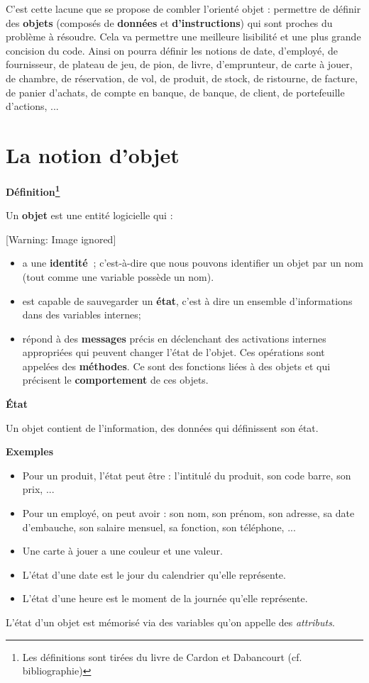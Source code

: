 {
C'est cette lacune que se propose de combler
l'orienté objet : permettre de définir des
\textbf{objets} (composés de \textbf{données} et
\textbf{d'instructions}) qui sont proches du problème
à résoudre. Cela va permettre une meilleure lisibilité et une plus
grande concision du code. Ainsi on pourra définir les notions de date,
d'employé, de fournisseur, de plateau de jeu, de pion,
de livre, d'emprunteur, de carte à jouer, de chambre,
de réservation, de vol, de produit, de stock, de ristourne, de facture,
de panier d'achats, de compte en banque, de banque, de
client, de portefeuille d'actions, ...}

\section{La notion d'objet}
{\sffamily\bfseries\upshape
Définition\footnote{Les définitions sont tirées du livre de Cardon et
Dabancourt (cf. bibliographie)}}

{
Un \textbf{objet} est une entité logicielle qui :}

\begin{center}
 [Warning: Image ignored] %

\end{center}
\liststyleListi
\begin{itemize}
\item {
a une \textbf{identité~}; c'est-à-dire que nous pouvons
identifier un objet par un nom (tout comme une variable possède un
nom).}
\item {
est capable de sauvegarder un \textbf{état}, c'est à
dire un ensemble d'informations dans des variables
internes;}
\item {
répond à des \textbf{messages} précis en déclenchant des activations
internes appropriées qui peuvent changer l'état de
l'objet. Ces opérations sont appelées des
\textbf{méthodes}. Ce sont des fonctions liées à des objets et qui
précisent le \textbf{comportement} de ces objets.}
\end{itemize}
{\sffamily\bfseries\upshape
État}

{
Un objet contient de l'information, des données qui
définissent son état. }

{\bfseries
Exemples}

\liststyleListv
\begin{itemize}
\item {
Pour un produit, l'état peut être :
l'intitulé du produit, son code barre, son prix, ... }
\item {
Pour un employé, on peut avoir : son nom, son prénom, son adresse, sa
date d'embauche, son salaire mensuel, sa fonction, son
téléphone, ... }
\item {
Une carte à jouer a une couleur et une valeur.}
\item {
L'état d'une date est le jour du
calendrier qu'elle représente.}
\item {
L'état d'une heure est le moment de la
journée qu'elle représente.}
\end{itemize}
{
L'état d'un objet est mémorisé via des
variables qu'on appelle des \textit{attributs}.}

